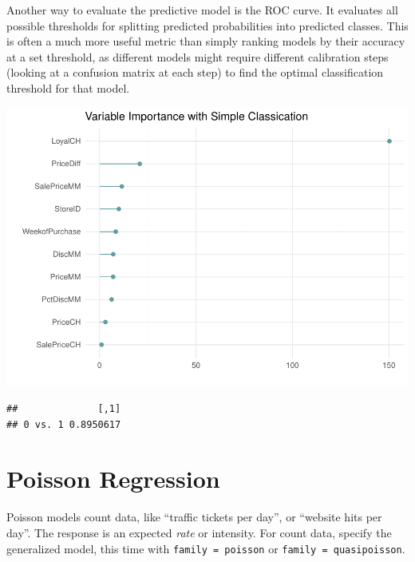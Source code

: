 \documentclass[
]{book}
\newenvironment{Shaded}{\begin{snugshade}}{\end{snugshade}}
\newcommand{\DataTypeTok}[1]{\textcolor[rgb]{0.13,0.29,0.53}{#1}}
\newcommand{\KeywordTok}[1]{\textcolor[rgb]{0.13,0.29,0.53}{\textbf{#1}}}
\newcommand{\NormalTok}[1]{#1}
\newcommand{\OperatorTok}[1]{\textcolor[rgb]{0.81,0.36,0.00}{\textbf{#1}}}
\newcommand{\OtherTok}[1]{\textcolor[rgb]{0.56,0.35,0.01}{#1}}
\begin{document}
Another way to evaluate the predictive model is the ROC curve. It evaluates all possible thresholds for splitting predicted probabilities into predicted classes. This is often a much more useful metric than simply ranking models by their accuracy at a set threshold, as different models might require different calibration steps (looking at a confusion matrix at each step) to find the optimal classification threshold for that model.

\begin{Shaded}
\end{Shaded}

\includegraphics{data-sci_files/figure-latex/unnamed-chunk-35-1.pdf}

\begin{verbatim}
##              [,1]
## 0 vs. 1 0.8950617
\end{verbatim}

\hypertarget{poisson-regression}{%
\section{Poisson Regression}\label{poisson-regression}}

Poisson models count data, like ``traffic tickets per day'', or ``website hits per day''. The response is an expected \emph{rate} or intensity. For count data, specify the generalized model, this time with \texttt{family\ =\ poisson} or \texttt{family\ =\ quasipoisson}.
\end{document}
